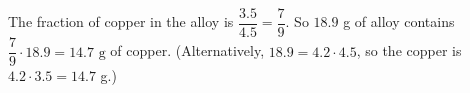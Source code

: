 The fraction of copper in the alloy is $\dfrac{3.5}{4.5}=\dfrac{7}{9}$. So $18.9$ g of alloy contains $\dfrac{7}{9}\cdot18.9=\boxed{14.7\text{ g}}$ of copper. (Alternatively, $18.9=4.2\cdot4.5$, so the copper is $4.2\cdot3.5=14.7$ g.)
